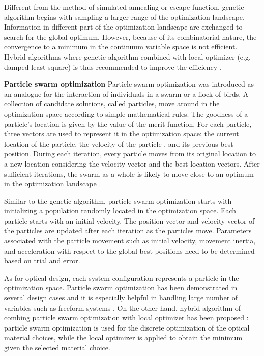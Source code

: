 Different from the method of simulated annealing or escape function, genetic algorithm begins with sampling a larger range of the optimization landscape. Information in different part of the optimization landscape are exchanged to search for the global optimum. However, because of its combinatorial nature, the convergence to a minimum in the continuum variable space is not efficient. Hybrid algorithms where genetic algorithm combined with local optimizer (e.g. damped-least square) is thus recommended to improve the efficiency \cite{Moore1999}.

\textbf{Particle swarm optimization}
Particle swarm optimization was introduced as an analogue for the interaction of individuals in a swarm or a flock of birds. A collection of candidate solutions, called particles, move around in the optimization space according to simple mathematical rules. The goodness of a particle's location is given by the value of the merit function. For each particle, three vectors are used to represent it in the optimization space: the current location of the particle, the velocity of the particle , and its previous best position. During each iteration, every particle moves from its original location to a new location considering the velocity vector and the best location vectors.  After sufficient iterations, the swarm as a whole is likely to move close to an optimum in the optimization landscape \cite{MenkeParticleSwarm} . 

Similar to the genetic algorithm, particle swarm optimization starts with initializing a population randomly located in the optimization space. Each particle starts with an initial velocity. The position vector and velocity vector of the particles are updated after each iteration as the particles move. Parameters associated with the particle movement such as initial velocity, movement inertia, and acceleration with respect to the global best positions need to be determined based on trial and error. 

As for optical design, each system configuration represents a particle in the optimization space. Particle swarm optimization has been demonstrated in several design cases and it is especially helpful in handling large number of variables such as freeform systems \cite{MenkeParticleSwarm}. On the other hand, hybrid algorithm of combing particle swarm optimization with local optimizer has been proposed \cite{Guo:sParticleSwarm}: particle swarm optimization is used for the discrete optimization of the optical material choices, while the local optimizer is applied to obtain the minimum given the selected material choice.  

